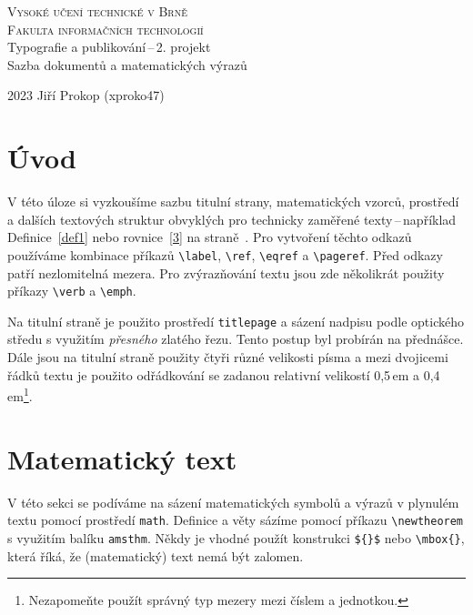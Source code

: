 \documentclass[a4paper, 11pt]{article}
\begin{document}
\begin{titlepage}
\begin{center}

\textsc{\Huge Vysoké učení technické v Brně \\}
\vspace{0.5 em}
\textsc{\huge Fakulta informačních technologií\\}
{\LARGE Typografie a publikování\,--\,2. projekt\\}
\vspace{0.4 em}
{\LARGE Sazba dokumentů a matematických výrazů \\}
\end{center}

{\Large 2023 \hfill Jiří Prokop (xproko47)}
\end{titlepage}
\twocolumn


\section* {Úvod}
V této úloze si vyzkoušíme sazbu titulní strany, matematických vzorců, prostředí a dalších textových struktur obvyklých
pro technicky zaměřené texty\,--\,například Definice~\ref{def1} nebo rovnice~\eqref{3} na straně~\pageref{3}. Pro vytvoření
těchto
odkazů používáme kombinace příkazů \verb|\label|, \verb|\ref|, \verb|\eqref| a \verb|\pageref|. Před odkazy patří nezlomitelná 
mezera. Pro zvýrazňování textu jsou zde několikrát použity příkazy \verb|\verb| a \verb|\emph|.

Na titulní straně je použito prostředí \verb|titlepage| a sázení nadpisu podle optického středu s využitím \emph{přesného} 
zlatého řezu. Tento postup byl probírán na přednášce. Dále jsou na titulní straně použity čtyři různé velikosti písma a mezi 
dvojicemi řádků textu je použito odřádkování se zadanou relativní velikostí 0,5\,em a 0,4\,em\footnote{Nezapomeňte použít 
správný typ mezery mezi číslem a jednotkou.}.

\section{Matematický text}
V této sekci se podíváme na sázení matematických symbolů a výrazů v plynulém textu pomocí prostředí \verb|math|. Definice a 
věty sázíme pomocí příkazu \verb|\newtheorem| s využitím balíku \verb|amsthm|. Někdy je vhodné použít konstrukci \verb|${}$| 
nebo \verb|\mbox{}|, která říká, že (matematický) text nemá být zalomen.
\end{document}
